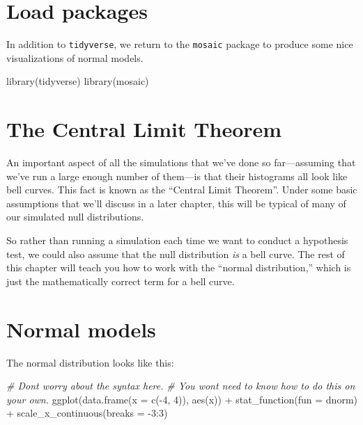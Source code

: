 \documentclass[
]{book}
\newenvironment{Shaded}{\begin{snugshade}}{\end{snugshade}}
\newcommand{\AttributeTok}[1]{\textcolor[rgb]{0.77,0.63,0.00}{#1}}
\newcommand{\CommentTok}[1]{\textcolor[rgb]{0.56,0.35,0.01}{\textit{#1}}}
\newcommand{\DecValTok}[1]{\textcolor[rgb]{0.00,0.00,0.81}{#1}}
\newcommand{\FunctionTok}[1]{\textcolor[rgb]{0.00,0.00,0.00}{#1}}
\newcommand{\NormalTok}[1]{#1}
\newcommand{\SpecialCharTok}[1]{\textcolor[rgb]{0.00,0.00,0.00}{#1}}
\begin{document}
\hypertarget{normal-load}{%
\section{Load packages}\label{normal-load}}

In addition to \texttt{tidyverse}, we return to the \texttt{mosaic} package to produce some nice visualizations of normal models.

\begin{Shaded}
\begin{Highlighting}[]
\FunctionTok{library}\NormalTok{(tidyverse)}
\FunctionTok{library}\NormalTok{(mosaic)}
\end{Highlighting}
\end{Shaded}

\hypertarget{normal-clt}{%
\section{The Central Limit Theorem}\label{normal-clt}}

An important aspect of all the simulations that we've done so far---assuming that we've run a large enough number of them---is that their histograms all look like bell curves. This fact is known as the ``Central Limit Theorem''. Under some basic assumptions that we'll discuss in a later chapter, this will be typical of many of our simulated null distributions.

So rather than running a simulation each time we want to conduct a hypothesis test, we could also assume that the null distribution \emph{is} a bell curve. The rest of this chapter will teach you how to work with the ``normal distribution,'' which is just the mathematically correct term for a bell curve.

\hypertarget{normal-normal}{%
\section{Normal models}\label{normal-normal}}

The normal distribution looks like this:

\begin{Shaded}
\begin{Highlighting}[]
\CommentTok{\# Don\textquotesingle{}t worry about the syntax here.}
\CommentTok{\# You won\textquotesingle{}t need to know how to do this on your own.}
\FunctionTok{ggplot}\NormalTok{(}\FunctionTok{data.frame}\NormalTok{(}\AttributeTok{x =} \FunctionTok{c}\NormalTok{(}\SpecialCharTok{{-}}\DecValTok{4}\NormalTok{, }\DecValTok{4}\NormalTok{)), }\FunctionTok{aes}\NormalTok{(x)) }\SpecialCharTok{+}
    \FunctionTok{stat\_function}\NormalTok{(}\AttributeTok{fun =}\NormalTok{ dnorm) }\SpecialCharTok{+}
    \FunctionTok{scale\_x\_continuous}\NormalTok{(}\AttributeTok{breaks =} \SpecialCharTok{{-}}\DecValTok{3}\SpecialCharTok{:}\DecValTok{3}\NormalTok{)}
\end{Highlighting}
\end{Shaded}
\end{document}
